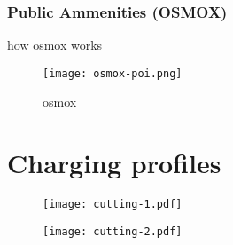 \subsubsection{Public Ammenities (OSMOX)}

how osmox works
\begin{figure}[hb]
    \texttt{[image: osmox-poi.png]}
    \caption[osmox]{osmox}
    \label{fig:nn-latent}
\end{figure}


\section{Charging profiles}


\begin{figure}[hb]
    \texttt{[image: cutting-1.pdf]}
\end{figure}

\begin{figure}[hb]
    \texttt{[image: cutting-2.pdf]}
\end{figure}


\section{}